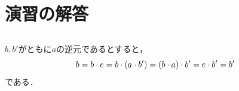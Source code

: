 \chapter{演習の解答}

\section*{}

\(b, b'\)がともに\(a\)の逆元であるとすると，
\begin{equation*}
	b = b \cdot e = b \cdot \paren{a \cdot b'} = \paren{b \cdot a} \cdot b' = e \cdot b' = b'
\end{equation*}
である．
